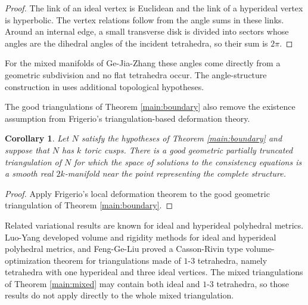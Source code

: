 \documentclass[oneside,a4paper,12pt]{article}
\theoremstyle{plain}
\newtheorem{corollary}[theorem]{Corollary}
\theoremstyle{definition}
\theoremstyle{remark}
\numberwithin{equation}{section}
\begin{document}
\begin{proof}
The link of an ideal vertex is Euclidean and the link of a hyperideal vertex is hyperbolic. The vertex relations follow from the angle sums in these links. Around an internal edge, a small transverse disk is divided into sectors whose angles are the dihedral angles of the incident tetrahedra, so their sum is $2\pi$.
\end{proof}

For the mixed manifolds of Ge-Jia-Zhang these angles come directly from a geometric subdivision and no flat tetrahedra occur. The angle-structure construction in \cite{GJZangle} uses additional topological hypotheses.

The good triangulations of Theorem \ref{main:boundary} also remove the existence assumption from Frigerio's triangulation-based deformation theory.

\begin{corollary}\label{corollary:frigerio-deformation}
Let $N$ satisfy the hypotheses of Theorem \ref{main:boundary} and suppose that $N$ has $k$ toric cusps. There is a good geometric partially truncated triangulation of $N$ for which the space of solutions to the consistency equations is a smooth real $2k$-manifold near the point representing the complete structure.
\end{corollary}

\begin{proof}
Apply Frigerio's local deformation theorem \cite{Frigerio} to the good geometric triangulation of Theorem \ref{main:boundary}.
\end{proof}

Related variational results are known for ideal and hyperideal polyhedral metrics. Luo-Yang \cite{LuoYang} developed volume and rigidity methods for ideal and hyperideal polyhedral metrics, and Feng-Ge-Liu \cite{KGL} proved a Casson-Rivin type volume-optimization theorem for triangulations made of $1$-$3$ tetrahedra, namely tetrahedra with one hyperideal and three ideal vertices. The mixed triangulations of Theorem \ref{main:mixed} may contain both ideal and $1$-$3$ tetrahedra, so those results do not apply directly to the whole mixed triangulation.
\end{document}
